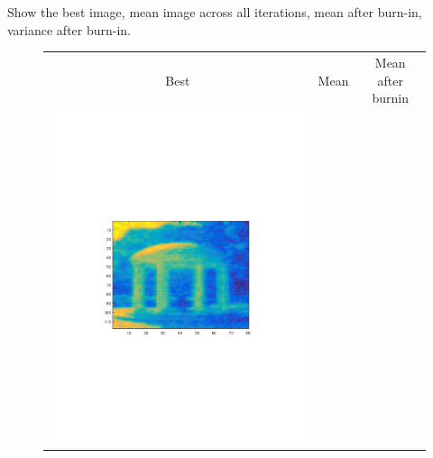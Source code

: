 \documentclass{article}
\begin{document}
Show the best image, mean image across all iterations, mean after burn-in, variance
after burn-in.
\begin{figure}
\begin{tabular}{ccc}
Best & Mean & Mean after burnin\\
\includegraphics[scale=0.25]{bestx.pdf}
&


\end{tabular}
\end{figure}
\end{document}
